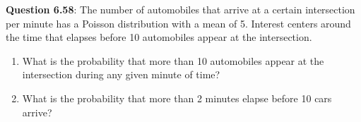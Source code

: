 \documentclass{article}
\begin{document}
    \noindent\textbf{Question 6.58}: The number of automobiles that arrive at a certain 
    intersection per minute has a Poisson distribution with a mean of 5. Interest centers 
    around the time that elapses before 10 automobiles appear at the intersection.
        \begin{enumerate}[label = (\alph*) ]
            \item What is the probability that more than 10 automobiles appear at the 
            intersection during any given minute of time?
            \item What is the probability that more than 2 minutes elapse before 10 
            cars arrive?
        \end{enumerate}
\end{document}
